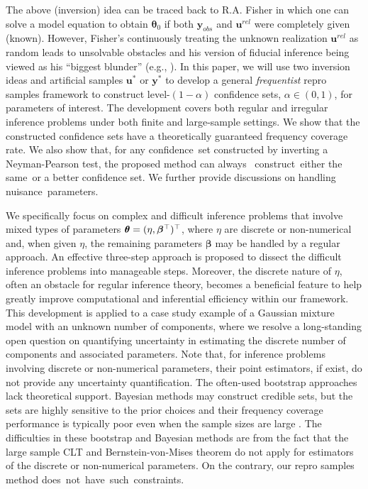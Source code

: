 \documentclass[12pt]{article}
\theoremstyle{shortspace}
\def\*#1{\bm{#1}}
\def\btheta{\mathop{\theta\kern-.45em\hbox{$\theta$}}\nolimits}
\begin{document}
The above (inversion) idea can be traced back to R.A. Fisher in which one can solve a model equation to obtain $\*\theta_0$ if both $\*y_{obs}$ and $\*u^{rel}$ were completely given (known). However, Fisher's continuously treating the unknown realization $\*u^{rel}$ as random leads to unsolvable obstacles and his version of fiducial inference being viewed as his ``biggest blunder'' 
(e.g., \citealt{Efron1998, Hannig2016, Thornton2022}).   
In this paper, we will use two inversion ideas and artificial samples $\*u^*$ or $\*y^*$ to develop a general {\it frequentist} repro samples framework to construct level-$(1 -\alpha)$ confidence sets, $\alpha \in (0,1)$, for parameters of interest.
The development covers both regular and irregular inference problems under both finite and large-sample settings.
We show that the constructed confidence sets 
have a theoretically guaranteed frequency coverage rate. We also show that, for any confidence~set constructed by inverting a Neyman-Pearson test, 
the proposed method can always ~construct~either the same~or a better confidence set. 
We further provide discussions on handling nuisance~parameters.
 
  

We specifically 
focus on complex and difficult inference problems that involve mixed types of parameters $\btheta = (\eta, {\*\beta}^\top)^\top$, where $\eta$ are discrete or non-numerical and, when given $\eta$, the remaining parameters $\*\beta$ may 
be handled by a regular approach. 
An effective three-step approach
is proposed to dissect the difficult inference problems into manageable steps. Moreover, the discrete nature of $\eta$, often an obstacle for regular inference theory, becomes a beneficial feature to help greatly improve computational and inferential efficiency within our framework.
This development is applied to a case study example of a Gaussian mixture model with an unknown number of components, where we resolve a long-standing open question on quantifying uncertainty in estimating the discrete number of components and associated parameters.
Note that, for inference problems involving discrete or non-numerical parameters, 
their point estimators, if exist, do not provide any uncertainty quantification. The often-used bootstrap approaches lack theoretical support. Bayesian methods may construct credible sets, but the sets are highly sensitive to the prior choices and their frequency coverage performance is typically poor even when the sample sizes are large \citep{hastie2012,Kass1995}. 
The difficulties 
in these bootstrap and Bayesian methods are from the fact that the 
large sample 
CLT 
and Bernstein-von-Mises theorem do not apply for estimators of the discrete or non-numerical parameters. On the contrary, our repro samples method does~not~have~such~constraints. 
\end{document}
